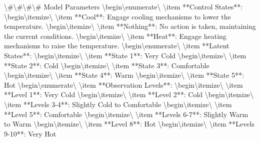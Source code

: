 \documentclass[11pt,a4paper]{article}
\begin{document}
\textbackslash{}#\textbackslash{}#\textbackslash{}#\textbackslash{}# Model Parameters
\textbackslash{}begin\textbackslash{}{enumerate\textbackslash{}}
\textbackslash{}item **Control States**: 
\textbackslash{}begin\textbackslash{}{itemize\textbackslash{}}
\textbackslash{}item **Cool**: Engage cooling mechanisms to lower the temperature.
\textbackslash{}begin\textbackslash{}{itemize\textbackslash{}}
\textbackslash{}item **Nothing**: No action is taken, maintaining the current conditions.
\textbackslash{}begin\textbackslash{}{itemize\textbackslash{}}
\textbackslash{}item **Heat**: Engage heating mechanisms to raise the temperature.
\textbackslash{}begin\textbackslash{}{enumerate\textbackslash{}}
\textbackslash{}item **Latent States**: 
\textbackslash{}begin\textbackslash{}{itemize\textbackslash{}}
\textbackslash{}item **State 1**: Very Cold
\textbackslash{}begin\textbackslash{}{itemize\textbackslash{}}
\textbackslash{}item **State 2**: Cold
\textbackslash{}begin\textbackslash{}{itemize\textbackslash{}}
\textbackslash{}item **State 3**: Comfortable
\textbackslash{}begin\textbackslash{}{itemize\textbackslash{}}
\textbackslash{}item **State 4**: Warm
\textbackslash{}begin\textbackslash{}{itemize\textbackslash{}}
\textbackslash{}item **State 5**: Hot
\textbackslash{}begin\textbackslash{}{enumerate\textbackslash{}}
\textbackslash{}item **Observation Levels**:
\textbackslash{}begin\textbackslash{}{itemize\textbackslash{}}
\textbackslash{}item **Level 1**: Very Cold
\textbackslash{}begin\textbackslash{}{itemize\textbackslash{}}
\textbackslash{}item **Level 2**: Cold
\textbackslash{}begin\textbackslash{}{itemize\textbackslash{}}
\textbackslash{}item **Levels 3-4**: Slightly Cold to Comfortable
\textbackslash{}begin\textbackslash{}{itemize\textbackslash{}}
\textbackslash{}item **Level 5**: Comfortable
\textbackslash{}begin\textbackslash{}{itemize\textbackslash{}}
\textbackslash{}item **Levels 6-7**: Slightly Warm to Warm
\textbackslash{}begin\textbackslash{}{itemize\textbackslash{}}
\textbackslash{}item **Level 8**: Hot
\textbackslash{}begin\textbackslash{}{itemize\textbackslash{}}
\textbackslash{}item **Levels 9-10**: Very Hot
\end{document}

